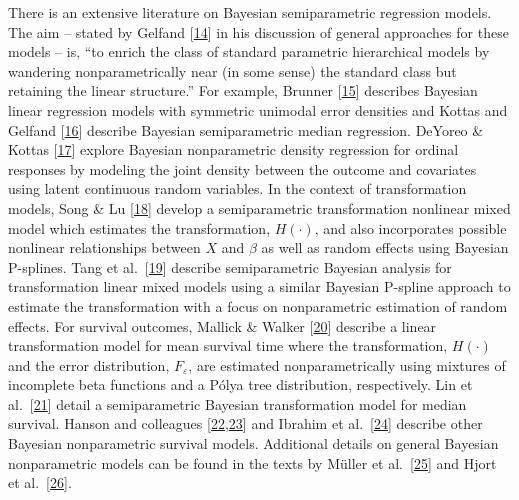 \documentclass[
]{article}
\begin{document}
There is an extensive literature on Bayesian semiparametric regression models. The aim -- stated by Gelfand {{[}\protect\hyperlink{ref-gelfand_approaches_1999}{14}{]}} in his discussion of general approaches for these models -- is, ``to enrich the class of standard parametric hierarchical models by wandering nonparametrically near (in some sense) the standard class but retaining the linear structure.'' For example, Brunner {{[}\protect\hyperlink{ref-brunner_bayesian_1995}{15}{]}} describes Bayesian linear regression models with symmetric unimodal error densities and Kottas and Gelfand {{[}\protect\hyperlink{ref-kottas_bayesian_2001}{16}{]}} describe Bayesian semiparametric median regression.
DeYoreo \& Kottas {{[}\protect\hyperlink{ref-deyoreo_bayesian_2020}{17}{]}} explore Bayesian nonparametric density regression for ordinal responses by modeling the joint density between the outcome and covariates using latent continuous random variables. In the context of transformation models, Song \& Lu {{[}\protect\hyperlink{ref-song_semiparametric_2012}{18}{]}} develop a semiparametric transformation nonlinear mixed model which estimates the transformation, \(H(\cdot)\), and also incorporates possible nonlinear relationships between \(X\) and \(\beta\) as well as random effects using Bayesian P-splines. Tang et al.~{{[}\protect\hyperlink{ref-tang_semiparametric_2018}{19}{]}} describe semiparametric Bayesian analysis for transformation linear mixed models using a similar Bayesian P-spline approach to estimate the transformation with a focus on nonparametric estimation of random effects. For survival outcomes, Mallick \& Walker {{[}\protect\hyperlink{ref-mallick_bayesian_2003}{20}{]}} describe a linear transformation model for mean survival time where the transformation, \(H(\cdot)\) and the error distribution, \(F_{\varepsilon}\), are estimated nonparametrically using mixtures of incomplete beta functions and a Pólya tree distribution, respectively. Lin et al.~{{[}\protect\hyperlink{ref-lin_semiparametric_2012}{21}{]}} detail a semiparametric Bayesian transformation model for median survival. Hanson and colleagues {{[}\protect\hyperlink{ref-damien_surviving_2013}{22},\protect\hyperlink{ref-hanson_bayesian_2007}{23}{]}} and Ibrahim et al.~{{[}\protect\hyperlink{ref-ibrahim_bayesian_2010}{24}{]}} describe other Bayesian nonparametric survival models. Additional details on general Bayesian nonparametric models can be found in the texts by Müller et al.~{{[}\protect\hyperlink{ref-muller_bayesian_2015}{25}{]}} and Hjort et al.~{{[}\protect\hyperlink{ref-hjort_bayesian_2010}{26}{]}}.
\end{document}
